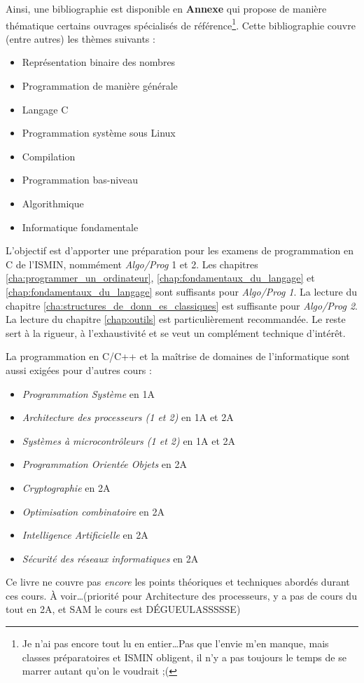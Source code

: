 \documentclass[../main.tex]{subfiles}
\begin{document}
Ainsi, une bibliographie est disponible en \textbf{Annexe} qui propose de manière thématique certains ouvrages spécialisés de référence\footnote{Je n'ai pas encore tout lu en entier\dots Pas que l'envie m'en manque, mais classes préparatoires et ISMIN obligent, il n'y a pas toujours le temps de se marrer autant qu'on le voudrait ;(}. Cette bibliographie couvre (entre autres) les thèmes suivants :
\begin{itemize}
	\item Représentation binaire des nombres \cite{MullerEtAl2018}\cite{BitHacks}
	\item Programmation de manière générale \cite{EoP}
	\item Langage C \cite{KR}\cite{MSRC}\cite{c11}
	\item Programmation système sous Linux \cite{LPI}
	\item Compilation \cite{gnumake}\cite{LL}\cite{AL}\cite{Aho}
	\item Programmation bas-niveau \cite{CSaPP}
	\item Algorithmique \cite{EltAlgorithmie}\cite{TAOCP}
	\item Informatique fondamentale \cite{ONotation}\cite{XFI}
\end{itemize}

L'objectif est d'apporter une préparation pour les examens de programmation en C de l'ISMIN, nommément \textit{Algo/Prog} 1 et 2. Les chapitres \ref{cha:programmer_un_ordinateur}, \ref{chap:fondamentaux_du_langage} et \ref{chap:fondamentaux_du_langage} sont suffisants pour \textit{Algo/Prog 1}. La lecture du chapitre \ref{cha:structures_de_donn_es_classiques} est suffisante pour \textit{Algo/Prog 2}. La lecture du chapitre \ref{chap:outils} est particulièrement recommandée. Le reste sert à la rigueur, à l'exhaustivité et se veut un complément technique d'intérêt.

La programmation en C/C++ et la maîtrise de domaines de l'informatique sont aussi exigées pour d'autres cours :
\begin{itemize}
	\item \textit{Programmation Système} en 1A
	\item \textit{Architecture des processeurs (1 et 2)} en 1A et 2A
	\item \textit{Systèmes à microcontrôleurs (1 et 2)} en 1A et 2A
	\item \textit{Programmation Orientée Objets} en 2A
	\item \textit{Cryptographie} en 2A
	\item \textit{Optimisation combinatoire} en 2A
	\item \textit{Intelligence Artificielle} en 2A
	\item \textit{Sécurité des réseaux informatiques} en 2A
\end{itemize}
Ce livre ne couvre pas \textit{encore} les points théoriques et techniques abordés durant ces cours. À voir\dots (priorité pour Architecture des processeurs, y a pas de cours du tout en 2A, et SAM le cours est DÉGUEULASSSSSE)
\end{document}
